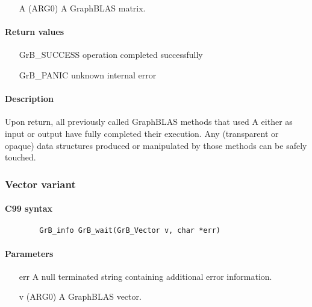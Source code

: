 \begin{itemize}[leftmargin=1.1in]
	\item[{\sf A}]	({\sf ARG0}) A GraphBLAS matrix.
\end{itemize}

\paragraph{Return values}
\begin{itemize}[leftmargin=2.1in]
\item[{\sf GrB\_SUCCESS}]	operation completed successfully
\item[{\sf GrB\_PANIC}]		unknown internal error
\end{itemize}

\paragraph{Description}

Upon return, all previously called GraphBLAS methods that used {\sf A} either as input or output have fully completed their execution.
Any (transparent or opaque) data structures produced or manipulated by those methods can be safely touched.

\subsubsection{Vector variant}

\paragraph{C99 syntax}

\begin{verbatim}
        GrB_info GrB_wait(GrB_Vector v, char *err)
\end{verbatim}

\paragraph{Parameters}
\begin{itemize}
\item[{\sf err}]     A null terminated string containing additional error
information.
\end{itemize}

\begin{itemize}[leftmargin=1.1in]
	\item[{\sf v}]	({\sf ARG0}) A GraphBLAS vector.
\end{itemize}

